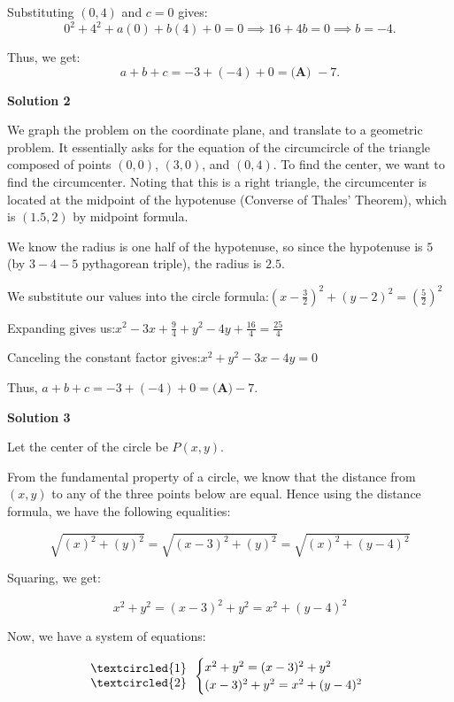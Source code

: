 \begin{enumerate}
 Substituting $(0,4)$ and $c = 0$ gives:
 \[0^2 + 4^2 + a(0) + b(4) + 0 = 0 \implies 16 + 4b = 0 \implies b = -4.\]

 Thus, we get:
 \[a + b + c = -3 + (-4) + 0 = \boxed{\textbf{(A) }-7}.\]




\textbf{Solution 2}

We graph the problem on the coordinate plane, and translate to a geometric problem.  It essentially asks for the equation of the circumcircle of the triangle composed of points $(0,0)$, $(3,0)$, and $(0,4)$.  To find the center, we want to find the circumcenter. Noting that this is a right triangle, the circumcenter is located at the midpoint of the hypotenuse (Converse of Thales' Theorem), which is $(1.5, 2)$ by midpoint formula.

 We know the radius is one half of the hypotenuse, so since the hypotenuse is $5$ (by $3-4-5$ pythagorean triple), the radius is $2.5$.

 We substitute our values into the circle formula:$(x-\frac{3}{2})^2+(y-2)^2=(\frac{5}{2})^2$

 Expanding gives us:$x^2-3x+\frac{9}{4}+y^2-4y+\frac{16}{4}=\frac{25}{4}$

 Canceling the constant factor gives:$x^2+y^2-3x-4y=0$

 Thus, $a+b+c=-3+(-4)+0=\boxed{\textbf{(A)}-7}$.

 



\textbf{Solution 3}

Let the center of the circle be $P (x, y)$.

 From the fundamental property of a circle, we know that the distance from $(x, y)$ to any of the three points below are equal. Hence using the distance formula, we have the following equalities:

 
 \[\sqrt{(x)^2 + (y)^2} = \sqrt{(x-3)^2 + (y)^2} = \sqrt{(x)^2 + (y-4)^2}\]

 Squaring, we get:

 
 \[x^2 + y^2 = (x-3)^2 + y^2 = x^2 + (y-4)^2\]

 Now, we have a system of equations:

 
 \[\begin{array}{r}   \textcircled{1} \\   \textcircled{2} \end{array} \begin{cases}    x^2 + y^2 = (x-3)^2 + y^2 \\    (x-3)^2 + y^2 = x^2 + (y-4)^2 \end{cases}\]


\end{enumerate}

